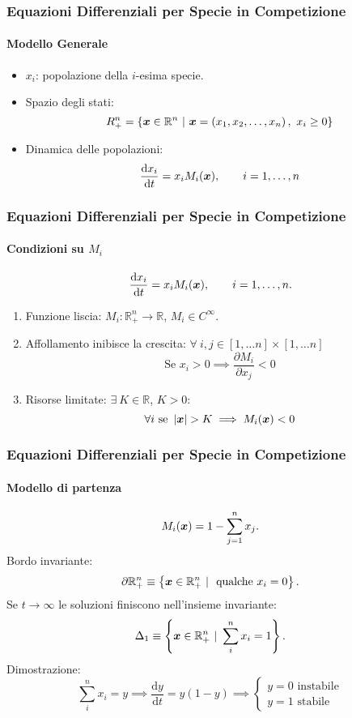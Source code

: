 \begin{frame}
\frametitle{Equazioni Differenziali per Specie in Competizione}
\framesubtitle{Modello Generale}
\begin{itemize}
    \item $x_i$: popolazione della $i$-esima specie.
    \item Spazio degli stati:
	\[
	    R_+^n = \left\{\boldsymbol{x}\in \mathbb{R}^n \ | \ \boldsymbol{x}= \left(x_1, x_2, \ldots, x_n\right), \ x_i \ge 0\right\}
	\] 
    \item Dinamica delle popolazioni:
	\begin{equation}
	    \frac{\text{d} x_i}{\text{d} t} = x_i M_i(\boldsymbol{x}), \qquad i = 1, \ldots, n
	\end{equation}
\end{itemize}
\end{frame}

\begin{frame}
\frametitle{Equazioni Differenziali per Specie in Competizione}
\framesubtitle{Condizioni su $M_i$}
\[
    \frac{\text{d} x_i}{\text{d} t} = x_i M_i(\boldsymbol{x}), \qquad i = 1, \ldots, n
.\] 
\begin{enumerate}
    \item Funzione liscia: $M_i: \mathbb{R}_+^n \to \mathbb{R}$,  $M_i \in C^{\infty}$.
	\label{en:c1}
    \item Affollamento inibisce la crescita: $\forall \ i, j \in \left[1, \ldots n\right] \times \left[1, \ldots n\right]$ 
	\label{en:c2}
	\[
	    \text{Se } x_i > 0  \implies \frac{\partial M_i}{\partial x_j} < 0
	\] 
    \item Risorse limitate: $\exists \ K\in \mathbb{R}$, $K>0$:
	\[
	    \forall i \text{ se } \left|\boldsymbol{x}\right| > K \implies  M_i(\boldsymbol{x})  < 0
	\] 
	\label{en:c3}
\end{enumerate}
\end{frame}

\begin{frame}
\frametitle{Equazioni Differenziali per Specie in Competizione}
\framesubtitle{Modello di partenza}
\[
M_i(\boldsymbol{x}) = 1-\sum_{j=1}^{n} x_j
.\] 
Bordo invariante:
\[
    \partial \mathbb{R}^n_+ \equiv \left\{\boldsymbol{x}\in \mathbb{R}^n_+ \ | \ \text{ qualche } x_i = 0\right\}
.\] 
Se $t\to \infty$ le soluzioni finiscono nell'insieme invariante:
\[
    \Delta_1 \equiv \left\{\v{x}\in \mathbb{R}^n_+ \ | \ \sum_{i}^{n} x_i = 1\right\}
.\] 
Dimostrazione:
\[
    \sum_{i}^{n} x_i = y \implies  \frac{\text{d} y}{\text{d} t} = y(1-y) \implies  
    \begin{cases}
        y=0 \text{ instabile}\\
        y=1 \text{ stabile}
    \end{cases}
\] 
\end{frame}

